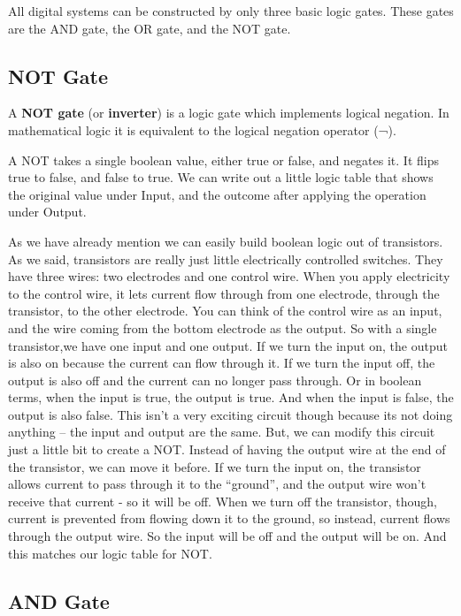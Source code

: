 All digital systems can be constructed by only three basic logic gates. These gates are the AND gate, the OR gate,
and the NOT gate.

\subsection{NOT Gate}

A \textbf{NOT gate} (or \textbf{inverter}) is a logic gate which implements logical negation. In mathematical logic
it is equivalent to the logical negation operator (¬).
\ed

A NOT takes a single boolean value, either true or false, and negates it. It flips true to false, and false to true.
We can write out a little logic table that shows the original value under Input, and the outcome after applying the
operation under Output.


As we have already mention we can easily build boolean logic out of transistors. As we said, transistors are really
just little electrically controlled switches. They have three wires: two electrodes and one control wire. When you
apply electricity to the control wire, it lets current flow through from one electrode, through the transistor, to
the other electrode. You can think of the control wire as an input, and the wire coming from the bottom electrode as
the output. So with a single transistor,we have one input and one output. If we turn the input on, the output is also
on because the current can flow through it. If we turn the input off, the output is also off and the current can no
longer pass through. Or in boolean terms, when the input is true, the output is true. And when the input is false,
the output is also false. This isn't a very exciting circuit though because its not doing anything -- the input and
output are the same. But, we can modify this circuit just a little bit to create a NOT. Instead of having the output
wire at the end of the transistor, we can move it before. If we turn the input on, the transistor allows current to
pass through it to the ``ground'', and the output wire won't receive that current - so it will be off. When we turn
off the transistor, though, current is prevented from flowing down it to the ground, so instead, current flows
through the output wire. So the input will be off and the output will be on. And this matches our logic table for NOT.


\subsection{AND Gate}

